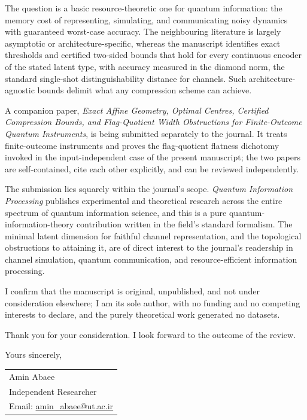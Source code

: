 \documentclass[10pt,a4paper]{article}
\begin{document}
The question is a basic resource-theoretic one for quantum information: the memory cost of representing, simulating, and communicating noisy dynamics with guaranteed worst-case accuracy. The neighbouring literature is largely asymptotic or architecture-specific, whereas the manuscript identifies exact thresholds and certified two-sided bounds that hold for every continuous encoder of the stated latent type, with accuracy measured in the diamond norm, the standard single-shot distinguishability distance for channels. Such architecture-agnostic bounds delimit what any compression scheme can achieve.

A companion paper, \emph{Exact Affine Geometry, Optimal Centres, Certified Compression Bounds, and Flag-Quotient Width Obstructions for Finite-Outcome Quantum Instruments}, is being submitted separately to the journal. It treats finite-outcome instruments and proves the flag-quotient flatness dichotomy invoked in the input-independent case of the present manuscript; the two papers are self-contained, cite each other explicitly, and can be reviewed independently.

The submission lies squarely within the journal's scope. \emph{Quantum Information Processing} publishes experimental and theoretical research across the entire spectrum of quantum information science, and this is a pure quantum-information-theory contribution written in the field's standard formalism. The minimal latent dimension for faithful channel representation, and the topological obstructions to attaining it, are of direct interest to the journal's readership in channel simulation, quantum communication, and resource-efficient information processing.

I confirm that the manuscript is original, unpublished, and not under consideration elsewhere; I am its sole author, with no funding and no competing interests to declare, and the purely theoretical work generated no datasets.

Thank you for your consideration. I look forward to the outcome of the review.

\vspace{0.8em}

\noindent Yours sincerely,

\vspace{1.4em}

\noindent
\begin{tabular}{@{}l@{}}
Amin Abaee\\
Independent Researcher\\
Email: \href{mailto:amin\_abaee@ut.ac.ir}{amin\_abaee@ut.ac.ir}
\end{tabular}
\end{document}
